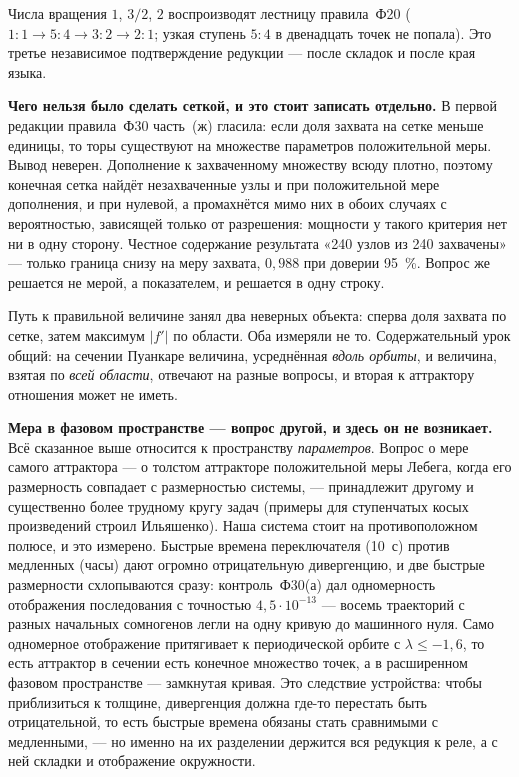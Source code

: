 \documentclass[11pt,a4paper]{article}
\begin{document}
Числа вращения $1$, $3/2$, $2$ воспроизводят лестницу правила~Ф20 ($1{:}1\to5{:}4\to3{:}2\to2{:}1$;
узкая ступень $5{:}4$ в двенадцать точек не попала). Это третье независимое подтверждение редукции
--- после складок и после края языка.

\textbf{Чего нельзя было сделать сеткой, и это стоит записать отдельно.} В первой редакции
правила~Ф30 часть~(ж) гласила: если доля захвата на сетке меньше единицы, то торы существуют на
множестве параметров положительной меры. Вывод неверен. Дополнение к захваченному множеству всюду
плотно, поэтому конечная сетка найдёт незахваченные узлы и при положительной мере дополнения, и при
нулевой, а промахнётся мимо них в обоих случаях с вероятностью, зависящей только от разрешения:
мощности у такого критерия нет ни в одну сторону. Честное содержание результата «240 узлов из 240
захвачены» --- только граница снизу на меру захвата, $0{,}988$ при доверии 95~\%. Вопрос же решается
не мерой, а показателем, и решается в одну строку.

Путь к правильной величине занял два неверных объекта: сперва доля захвата по сетке, затем максимум
$|f'|$ по области. Оба измеряли не то. Содержательный урок общий: на сечении Пуанкаре величина,
усреднённая \emph{вдоль орбиты}, и величина, взятая по \emph{всей области}, отвечают на разные
вопросы, и вторая к аттрактору отношения может не иметь.

\textbf{Мера в фазовом пространстве --- вопрос другой, и здесь он не возникает.} Всё сказанное выше
относится к пространству \emph{параметров}. Вопрос о мере самого аттрактора --- о толстом
аттракторе положительной меры Лебега, когда его размерность совпадает с размерностью системы, ---
принадлежит другому и существенно более трудному кругу задач (примеры для ступенчатых косых
произведений строил Ильяшенко). Наша система стоит на противоположном полюсе, и это измерено.
Быстрые времена переключателя (10~с) против медленных (часы) дают огромно отрицательную дивергенцию,
и две быстрые размерности схлопываются сразу: контроль~Ф30(а) дал одномерность отображения
последования с точностью $4{,}5\cdot10^{-13}$ --- восемь траекторий с разных начальных сомногенов
легли на одну кривую до машинного нуля. Само одномерное отображение притягивает к периодической
орбите с $\lambda\le-1{,}6$, то есть аттрактор в сечении есть конечное множество точек, а в
расширенном фазовом пространстве --- замкнутая кривая. Это следствие устройства: чтобы приблизиться
к толщине, дивергенция должна где-то перестать быть отрицательной, то есть быстрые времена обязаны
стать сравнимыми с медленными, --- но именно на их разделении держится вся редукция к реле, а с ней
складки и отображение окружности.
\end{document}
